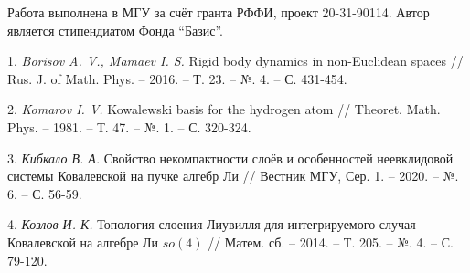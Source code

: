 \begin{figure}[h]
			\label{bif_diagr}
		\end{figure}



Работа выполнена в МГУ за счёт гранта РФФИ, проект 20-31-90114. Автор является стипендиатом Фонда ``Базис''.

\litlist

1. {\it Borisov A. V., Mamaev I. S.} Rigid body dynamics in non-Euclidean spaces  // Rus. J. of
Math. Phys. – 2016. – Т. 23. – №. 4. – С. 431-454.

2. {\it Komarov I. V.} Kowalewski basis for the hydrogen atom
  // Theoret. Math. Phys. – 1981. – Т. 47. – №. 1. – С. 320-324.

3. {\it Кибкало В. А.} Свойство некомпактности слоёв и особенностей неевклидовой системы Ковалевской на пучке алгебр Ли  // Вестник МГУ, Сер. 1. – 2020. – №. 6. – С. 56-59.

4. {\it Козлов И. К.} Топология слоения Лиувилля для интегрируемого случая Ковалевской на алгебре Ли $so(4)$
  // Матем. сб. – 2014. – Т. 205. – №. 4. – С. 79-120.
